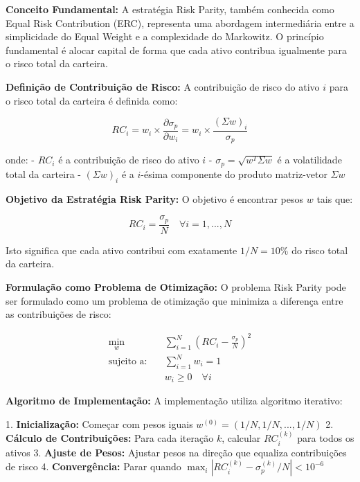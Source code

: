 \textbf{Conceito Fundamental:} A estratégia Risk Parity, também conhecida como Equal Risk Contribution (ERC), representa uma abordagem intermediária entre a simplicidade do Equal Weight e a complexidade do Markowitz. O princípio fundamental é alocar capital de forma que cada ativo contribua igualmente para o risco total da carteira.

\textbf{Definição de Contribuição de Risco:} A contribuição de risco do ativo $i$ para o risco total da carteira é definida como:

\begin{equation}
RC_i = w_i \times \frac{\partial \sigma_p}{\partial w_i} = w_i \times \frac{(\Sigma w)_i}{\sigma_p}
\end{equation}

onde:
- $RC_i$ é a contribuição de risco do ativo $i$
- $\sigma_p = \sqrt{w^T \Sigma w}$ é a volatilidade total da carteira
- $(\Sigma w)_i$ é a $i$-ésima componente do produto matriz-vetor $\Sigma w$

\textbf{Objetivo da Estratégia Risk Parity:} O objetivo é encontrar pesos $w$ tais que:

\begin{equation}
RC_i = \frac{\sigma_p}{N} \quad \forall i = 1, ..., N
\end{equation}

Isto significa que cada ativo contribui com exatamente $1/N = 10\%$ do risco total da carteira.

\textbf{Formulação como Problema de Otimização:} O problema Risk Parity pode ser formulado como um problema de otimização que minimiza a diferença entre as contribuições de risco:

\begin{align}
\min_{w} \quad & \sum_{i=1}^{N} \left(RC_i - \frac{\sigma_p}{N}\right)^2 \\
\text{sujeito a:} \quad & \sum_{i=1}^{N} w_i = 1 \\
& w_i \geq 0 \quad \forall i
\end{align}

\textbf{Algoritmo de Implementação:} A implementação utiliza algoritmo iterativo:

1. \textbf{Inicialização:} Começar com pesos iguais $w^{(0)} = (1/N, 1/N, ..., 1/N)$
2. \textbf{Cálculo de Contribuições:} Para cada iteração $k$, calcular $RC_i^{(k)}$ para todos os ativos
3. \textbf{Ajuste de Pesos:} Ajustar pesos na direção que equaliza contribuições de risco
4. \textbf{Convergência:} Parar quando $\max_i |RC_i^{(k)} - \sigma_p^{(k)}/N| < 10^{-6}$

